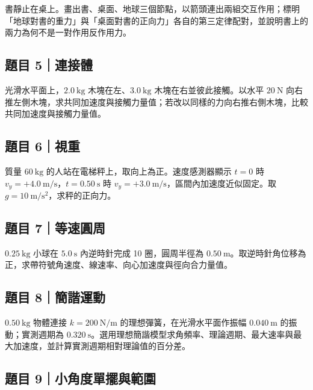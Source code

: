 \documentclass[11pt,a4paper]{article}
\begin{document}
書靜止在桌上。畫出書、桌面、地球三個節點，以箭頭連出兩組交互作用；標明「地球對書的重力」與「桌面對書的正向力」各自的第三定律配對，並說明書上的兩力為何不是一對作用反作用力。

\subsection{題目 5｜連接體}\label{ux984cux76ee-5ux9023ux63a5ux9ad4}

光滑水平面上，\(2.0\ \mathrm{kg}\) 木塊在左、\(3.0\ \mathrm{kg}\) 木塊在右並彼此接觸。以水平 \(20\ \mathrm N\) 向右推左側木塊，求共同加速度與接觸力量值；若改以同樣的力向右推右側木塊，比較共同加速度與接觸力量值。

\subsection{題目 6｜視重}\label{ux984cux76ee-6ux8996ux91cd}

質量 \(60\ \mathrm{kg}\) 的人站在電梯秤上，取向上為正。速度感測器顯示 \(t=0\) 時 \(v_y=+4.0\ \mathrm{m/s}\)，\(t=0.50\ \mathrm s\) 時 \(v_y=+3.0\ \mathrm{m/s}\)，區間內加速度近似固定。取 \(g=10\ \mathrm{m/s^2}\)，求秤的正向力。

\subsection{題目 7｜等速圓周}\label{ux984cux76ee-7ux7b49ux901fux5713ux5468}

\(0.25\ \mathrm{kg}\) 小球在 \(5.0\ \mathrm s\) 內逆時針完成 10 圈，圓周半徑為 \(0.50\ \mathrm m\)。取逆時針角位移為正，求帶符號角速度、線速率、向心加速度與徑向合力量值。

\subsection{題目 8｜簡諧運動}\label{ux984cux76ee-8ux7c21ux8ae7ux904bux52d5}

\(0.50\ \mathrm{kg}\) 物體連接 \(k=200\ \mathrm{N/m}\) 的理想彈簧，在光滑水平面作振幅 \(0.040\ \mathrm m\) 的振動；實測週期為 \(0.320\ \mathrm s\)。選用理想簡諧模型求角頻率、理論週期、最大速率與最大加速度，並計算實測週期相對理論值的百分差。

\subsection{題目 9｜小角度單擺與範圍}\label{ux984cux76ee-9ux5c0fux89d2ux5ea6ux55aeux64faux8207ux7bc4ux570d}
\end{document}
